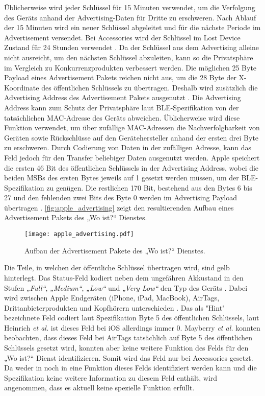 Üblicherweise wird jeder Schlüssel für 15 Minuten verwendet, um die Verfolgung des Geräts anhand der Advertising-Daten für Dritte zu erschweren.
Nach Ablauf der 15 Minuten wird ein neuer Schlüssel abgeleitet und für die nächste Periode im Advertisement versendet.
Bei Accessories wird der Schlüssel im Lost Device Zustand für 24 Stunden verwendet \cite{Mayberry_Tracking}.
Da der Schlüssel aus dem Advertising alleine nicht ausreicht, um den nächsten Schlüssel abzuleiten, kann so die Privatsphäre im Vergleich zu Konkurrenzprodukten verbessert werden.
Die möglichen 25 Byte Payload eines Advertisement Pakets reichen nicht aus, um die 28 Byte der X-Koordinate des öffentlichen Schlüssels zu übertragen.
Deshalb  wird zusätzlich die Advertising Address des Advertisement Pakets ausgenutzt \cite{Heinrich_FindMy}.
Die Advertising Address kann zum Schutz der Privatsphäre laut \ac{BLE}-Spezifikation \cite{Spec_BLE_5.3} von der tatsächlichen \ac{MAC}-Adresse des Geräts abweichen.
Üblicherweise wird diese Funktion verwendet, um über zufällige \ac{MAC}-Adressen die Nachverfolgbarkeit von Geräten sowie Rückschlüsse auf den Gerätehersteller anhand der ersten drei Byte zu erschweren.
Durch Codierung von Daten in der zufälligen Adresse, kann das Feld jedoch für den Transfer beliebiger Daten ausgenutzt werden.
Apple speichert die ersten 46 Bit des öffentlichen Schlüssels in der Advertising Address, wobei die beiden \acp{MSB} des ersten Bytes jeweils auf 1 gesetzt werden müssen, um der \ac{BLE}-Spezifikation zu genügen.
Die restlichen 170 Bit, bestehend aus den Bytes 6 bis 27 und den fehlenden zwei Bits des Byte 0 werden im Advertising Payload übertragen \cite{Apple_FindMySpec,Heinrich_FindMy}.
\autoref{fig:apple_advertising} zeigt den resultierenden Aufbau eines Advertisement Pakets des „Wo ist?“ Dienstes.
\begin{figure}[ht]
    \centering
    \texttt{[image: apple\_advertising.pdf]}
    \caption{Aufbau der Advertisement Pakete des „Wo ist?“ Dienstes.}
    \label{fig:apple_advertising}
\end{figure}
Die Teile, in welchen der öffentliche Schlüssel übertragen wird, sind gelb hinterlegt.
Das Status-Feld kodiert neben dem ungefähren Akkustand in den Stufen \textit{„Full“}, \textit{„Medium“}, \textit{„Low“} und \textit{„Very Low“} den Typ des Geräts \cite{Mayberry_Tracking}.
Dabei wird zwischen Apple Endgeräten (iPhone, iPad, MacBook), AirTags, Drittanbieterprodukten und Kopfhörern unterschieden \cite{Heinrich_AirGuard}.
Das als "Hint" bezeichnete Feld codiert laut Spezifikation \cite{Apple_FindMySpec} Byte 5 des öffentlichen Schlüssels, laut Heinrich \textit{et al.} \cite{Heinrich_FindMy} ist dieses Feld bei iOS allerdings immer 0.
Mayberry \textit{et al.} \cite{Mayberry_Tracking} konnten beobachten, dass dieses Feld bei AirTags tatsächlich auf Byte 5 des öffentlichen Schlüssels gesetzt wird, konnten aber keine weitere Funktion des Felds für den „Wo ist?“ Dienst identifizieren.
Somit wird das Feld nur bei Accessories gesetzt.
Da weder in \cite{Heinrich_FindMy} noch in \cite{Mayberry_Tracking} eine Funktion dieses Felds identifiziert werden kann und die Spezifikation \cite{Apple_FindMySpec} keine weitere Information zu diesem Feld enthält, wird angenommen, dass es aktuell keine spezielle Funktion erfüllt.

